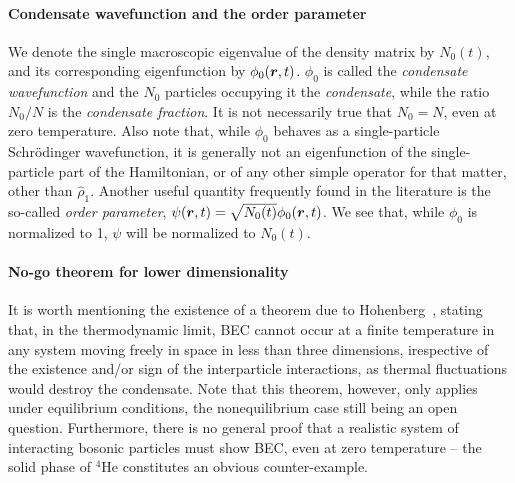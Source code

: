 \paragraph{Condensate wavefunction and the order parameter}
We denote the single macroscopic eigenvalue of the density matrix by
$N_0(t)$, and its corresponding eigenfunction by
$\phi_0(\bm{r},t)$. $\phi_0$ is called the \textit{condensate
  wavefunction} and the $N_0$ particles occupying it the
\textit{condensate}, while the ratio $N_0/N$ is the \textit{condensate
  fraction}. It is not necessarily true that $N_0 = N$, even at zero
temperature. Also note that, while $\phi_0$ behaves as a
single-particle Schr\"{o}dinger wavefunction, it is generally not an
eigenfunction of the single-particle part of the Hamiltonian, or of
any other simple operator for that matter, other than
$\hat{\rho}_1$. Another useful quantity frequently found in the
literature is the so-called \textit{order parameter},
$\psi(\bm{r},t) = \sqrt{N_0(t)}\phi_0(\bm{r},t)$. We see that, while
$\phi_0$ is normalized to 1, $\psi$ will be normalized to $N_0(t)$.

\paragraph{No-go theorem for lower dimensionality}
It is worth mentioning the existence of a theorem due to
Hohenberg~\cite{PhysRev.158.383}, stating that, in the thermodynamic
limit, BEC cannot occur at a finite temperature in any system moving
freely in space in less than three dimensions, irespective of the
existence and/or sign of the interparticle interactions, as thermal
fluctuations would destroy the condensate. Note that this theorem,
however, only applies under equilibrium conditions, the nonequilibrium
case still being an open question.  Furthermore, there is no general
proof that a realistic system of interacting bosonic particles must
show BEC, even at zero temperature -- the solid phase of ${}^4$He
constitutes an obvious counter-example.

